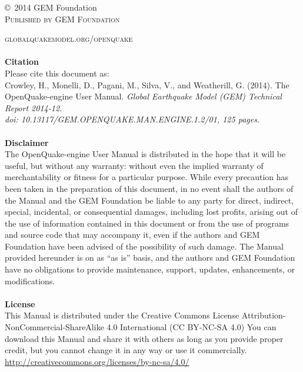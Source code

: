 \documentclass[11pt,fleqn]{book} %
\begin{document}
\noindent \copyright\ 2014 GEM Foundation\\ %

\noindent \textsc{Published by GEM Foundation} %

\noindent \textsc{globalquakemodel.org/openquake}\\ %

\noindent \hfill \\
   {\textbf{Citation}} \hfill \\
   Please cite this document as: \hfill \\
   Crowley, H., Monelli, D., Pagani, M., Silva, V., 
   and Weatherill, G. (2014). 
   The OpenQuake-engine User Manual. 
   \textit{Global Earthquake Model (GEM) Technical Report 2014-12.\\ 
   doi: 10.13117/GEM.OPENQUAKE.MAN.ENGINE.1.2/01, 125 pages.} \\
   \hfill \\

\noindent
   {\bf{Disclaimer}} \hfill \\
   The OpenQuake-engine User Manual is distributed in the hope that it will be 
   useful, but without any warranty: without even the implied warranty of 
   merchantability or fitness for a particular purpose. While every precaution 
   has been taken in the preparation of this document, in no event shall the 
   authors of the Manual and the GEM Foundation be liable to any party for 
   direct, indirect, special, incidental, or consequential damages, including 
   lost profits, arising out of the use of information contained in this 
   document or from the use of programs and source code that may accompany it, 
   even if the authors and GEM Foundation have been advised of the possibility 
   of such damage. The Manual provided hereunder is on as ``as is'' basis, and the 
   authors and GEM Foundation have no obligations to provide maintenance, 
   support, updates, enhancements, or modifications. \hfill \\
   \hfill \\
\noindent
   {\bf{License}} \hfill \\
   This Manual is distributed under the Creative Commons License 
   Attribution-NonCommercial-ShareAlike 4.0 International (CC BY-NC-SA 4.0)
   You can download this Manual and share it with 
   others as long as you provide proper credit, but you cannot change 
   it in any way or use it commercially.\hfill \\
   \href{http://creativecommons.org/licenses/by-nc-sa/4.0/}
   {http://creativecommons.org/licenses/by-nc-sa/4.0/}\hfill \\
\end{document}
